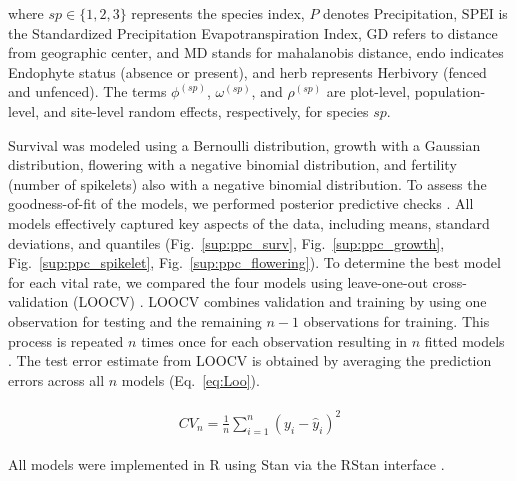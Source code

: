 \documentclass[12pt]{article}\usepackage[]{graphicx}\usepackage[dvipsnames]{xcolor}
\begin{document}
\noindent where \( sp \in \{1, 2, 3\} \) represents the species index, \( P \) denotes Precipitation, \( \text{SPEI} \) is the Standardized Precipitation Evapotranspiration Index, \( \text{GD} \) refers to distance from geographic center, and \( \text{MD} \) stands for mahalanobis distance, \( \text{endo} \) indicates Endophyte status (absence or present), and \( \text{herb} \) represents Herbivory (fenced and unfenced). The terms \( \phi^{(sp)} \), \( \omega^{(sp)} \), and \( \rho^{(sp)} \) are plot-level, population-level, and site-level random effects, respectively, for species \( sp \).

Survival was modeled using a Bernoulli distribution, growth with a Gaussian distribution, flowering with a negative binomial distribution, and fertility (number of spikelets) also with a negative binomial distribution.
To assess the goodness-of-fit of the models, we performed posterior predictive checks \citep{gelman2000diagnostic, berkhof2000posterior}.  
All models effectively captured key aspects of the data, including means, standard deviations, and quantiles (Fig.~\ref{sup:ppc_surv}, Fig.~\ref{sup:ppc_growth}, Fig.~\ref{sup:ppc_spikelet}, Fig.~\ref{sup:ppc_flowering}).
To determine the best model for each vital rate, we compared the four models using leave-one-out cross-validation (LOOCV) \citep{vehtari2017practical}.  
LOOCV combines validation and training by using one observation for testing and the remaining $n-1$ observations for training.  
This process is repeated $n$ times once for each observation resulting in $n$ fitted models \citep{silva2024robust}.  
The test error estimate from LOOCV is obtained by averaging the prediction errors across all $n$ models (Eq.~\ref{eq:Loo}).

\begin{align}\label{eq:Loo}
\begin{split}
CV_{n} = \frac{1}{n} \sum_{i=1}^{n} (y_{i} - \hat{y}_{i})^2
\end{split}
\end{align}

All models were implemented in R \citep{RCoreTeam} using Stan via the RStan interface \citep{Rstan}.



\end{document}
